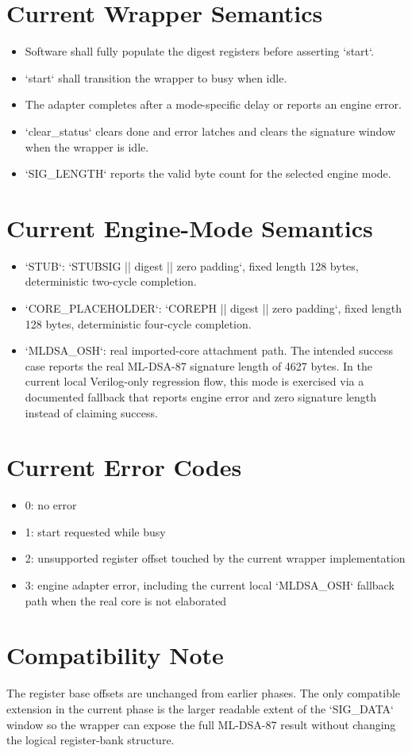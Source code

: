 \section{Current Wrapper Semantics}
\begin{itemize}[leftmargin=*]
  \item Software shall fully populate the digest registers before asserting `start`.
  \item `start` shall transition the wrapper to busy when idle.
  \item The adapter completes after a mode-specific delay or reports an engine error.
  \item `clear\_status` clears done and error latches and clears the signature window when the wrapper is idle.
  \item `SIG\_LENGTH` reports the valid byte count for the selected engine mode.
\end{itemize}

\section{Current Engine-Mode Semantics}
\begin{itemize}[leftmargin=*]
  \item `STUB`: `STUBSIG || digest || zero padding`, fixed length 128 bytes, deterministic two-cycle completion.
  \item `CORE\_PLACEHOLDER`: `COREPH || digest || zero padding`, fixed length 128 bytes, deterministic four-cycle completion.
  \item `MLDSA\_OSH`: real imported-core attachment path. The intended success case reports the real ML-DSA-87 signature length of 4627 bytes. In the current local Verilog-only regression flow, this mode is exercised via a documented fallback that reports engine error and zero signature length instead of claiming success.
\end{itemize}

\section{Current Error Codes}
\begin{itemize}[leftmargin=*]
  \item 0: no error
  \item 1: start requested while busy
  \item 2: unsupported register offset touched by the current wrapper implementation
  \item 3: engine adapter error, including the current local `MLDSA\_OSH` fallback path when the real core is not elaborated
\end{itemize}

\section{Compatibility Note}
The register base offsets are unchanged from earlier phases. The only compatible extension in the current phase is the larger readable extent of the `SIG\_DATA` window so the wrapper can expose the full ML-DSA-87 result without changing the logical register-bank structure.